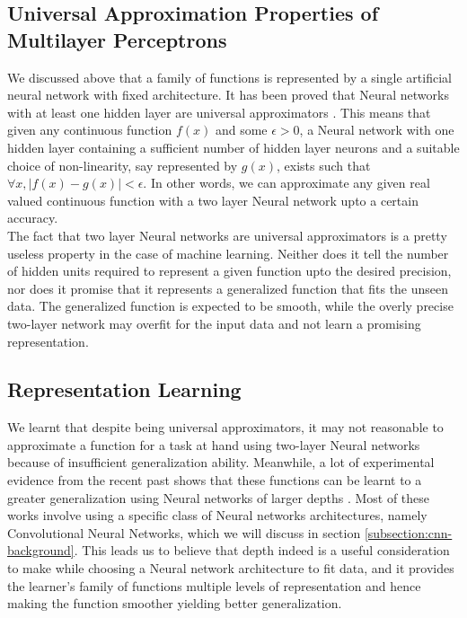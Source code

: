 \subsection{Universal Approximation Properties of Multilayer Perceptrons}
\label{subsection:universal-approx}
We discussed above that a family of functions is represented by a single 
artificial neural network with fixed architecture. It has been proved that 
Neural networks with at least one hidden layer are universal 
approximators \cite{hornik1989multilayer}. This means that given any continuous 
function $f(x)$ and some $\epsilon>0$, a Neural network with one hidden layer 
containing a sufficient number of hidden layer neurons and a suitable choice of 
non-linearity, say represented by $g(x)$, exists such that $\forall x, 
|f(x)-g(x)|<\epsilon$. In other words, we can approximate any given real 
valued continuous function with a two layer Neural network upto a certain 
accuracy.\\

The fact that two layer Neural networks are universal approximators 
is a pretty useless property in the case of machine learning. Neither does it 
tell the number of hidden units required to represent a given function upto the 
desired precision, nor does it promise that it represents a generalized 
function 
that fits the unseen data. The generalized function is expected to be smooth, 
while the overly precise two-layer network may overfit for the input data and 
not learn a promising representation.

\subsection{Representation Learning}
\label{subsection:representation}
We learnt that despite being universal approximators, it may not reasonable to 
approximate a function for a task at hand using two-layer Neural networks 
because of insufficient generalization ability. Meanwhile, a lot of 
experimental evidence from the recent past shows that these functions can be 
learnt to a greater generalization using Neural networks of larger depths 
\cite{bengio-dl-book}. Most of these works involve using a specific class of 
Neural networks architectures, namely Convolutional Neural Networks, which we 
will discuss in section \ref{subsection:cnn-background}. This leads us to 
believe that depth indeed is a useful consideration to make while choosing a 
Neural network architecture to fit data, and it provides the learner's family 
of functions multiple levels of representation and hence making the function 
smoother yielding better generalization. 

